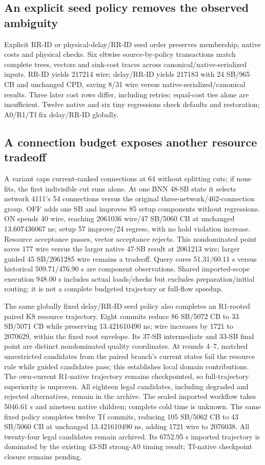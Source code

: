 \documentclass[conference,10pt]{IEEEtran}
\begin{document}
\subsection{An explicit seed policy removes the observed ambiguity}
Explicit RR-ID or physical-delay/RR-ID seed order preserves membership, native costs and physical checks. Six eltwise source-by-policy transactions match complete trees, vectors and sink-cost traces across canonical/native-serialized inputs. RR-ID yields 217214 wire; delay/RR-ID yields 217183 with 24 SB/965 CB and unchanged CPD, saving 8/31 wire versus native-serialized/canonical results. Three later cost rows differ, including retries; equal-cost ties alone are insufficient. Twelve native and six tiny regressions check defaults and restoration; A0/R1/Tf fix delay/RR-ID globally.


\subsection{A connection budget exposes another resource tradeoff}
A variant caps current-ranked connections at 64 without splitting cuts; if none fits, the first indivisible cut runs alone. At one BNN 48-SB state it selects network 4111's 54 connections versus the original three-network/462-connection group. OFF adds one SB and improves 85 setup components without regressions. ON spends 40 wire, reaching 2061036 wire/47 SB/5060 CB at unchanged 13.607436067 ns; setup 57 improve/24 regress, with no hold violation increase. Resource acceptance passes, vector acceptance rejects. This nondominated point saves 177 wire versus the larger native 47-SB result at 2061213 wire; larger guided 45 SB/2061285 wire remains a tradeoff. Query cores 51.31/60.11 s versus historical 509.71/476.90 s are component observations. Shared imported-scope execution 948.00 s includes actual loads/checks but excludes preparation/initial routing; it is not a complete budgeted trajectory or full-flow speedup.

The same globally fixed delay/RR-ID seed policy also completes an R1-rooted paired K8 resource trajectory. Eight commits reduce 86 SB/5072 CB to 33 SB/5071 CB while preserving 13.421610490 ns; wire increases by 1721 to 2070629, within the fixed root envelope. Its 37-SB intermediate and 33-SB final point are distinct nondominated quality coordinates. At rounds 4--7, matched unrestricted candidates from the paired branch's current states fail the resource rule while guided candidates pass; this establishes local domain contributions. The own-current R1-native trajectory remains checkpointed, so full-trajectory superiority is unproven. All eighteen legal candidates, including degraded and rejected alternatives, remain in the archive. The sealed imported workflow takes 5046.61 s and nineteen native children; complete cold time is unknown. The same fixed policy completes twelve Tf commits, reducing 105 SB/5062 CB to 43 SB/5060 CB at unchanged 13.421610490 ns, adding 1721 wire to 2076038. All twenty-four legal candidates remain archived. Its 6752.95 s imported trajectory is dominated by the existing 43-SB strong-A0 timing result; Tf-native checkpoint closure remains pending.
\end{document}
